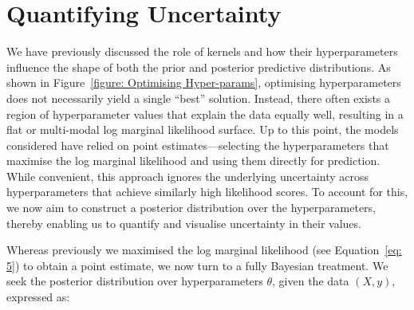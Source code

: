 \documentclass[12pt]{article}
\begin{document}
\section{Quantifying Uncertainty}
\label{sec: MCMC}
We have previously discussed the role of kernels and how their hyperparameters influence the shape of both the prior and posterior predictive distributions. As shown in Figure~\ref{figure: Optimising Hyper-params}, optimising hyperparameters does not necessarily yield a single “best” solution. 
Instead, there often exists a region of hyperparameter values that explain the data equally well, resulting in a flat or multi-modal log marginal likelihood surface.
Up to this point, the models considered have relied on point estimates—selecting the hyperparameters that maximise the log marginal likelihood and using them directly for prediction. 
While convenient, this approach ignores the underlying uncertainty across hyperparameters that achieve similarly high likelihood scores. To account for this, we now aim to construct a posterior distribution over the hyperparameters, thereby enabling us to quantify and visualise uncertainty in their values.

\noindent
Whereas previously we maximised the log marginal likelihood (see Equation~\ref{eq: 5}) to obtain a point estimate, we now turn to a fully Bayesian treatment. We seek the posterior distribution over hyperparameters \( \theta \), 
given the data \((X, y)\), expressed as:
\end{document}
